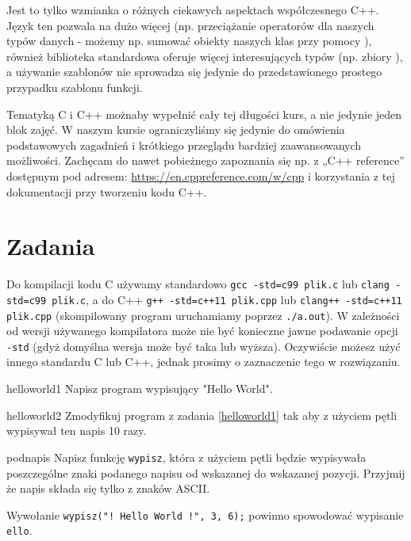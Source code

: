 \documentclass{pdfBooklets}
\begin{document}
Jest to tylko wzmianka o różnych ciekawych aspektach współczesnego C++. Język ten pozwala na dużo więcej (np. przeciążanie operatorów dla naszych typów danych - możemy np. sumować obiekty naszych klas przy pomocy \cpp{+}), również biblioteka standardowa oferuje więcej interesujących typów (np. zbiory ), a używanie szablonów nie sprowadza się jedynie do przedstawionego prostego przypadku szablonu funkcji.

Tematyką C i C++ możnaby wypełnić cały tej długości kurs, a nie jedynie jeden blok zajęć. W naszym kursie ograniczyliśmy się jedynie do omówienia podstawowych zagadnień i krótkiego przeglądu bardziej zaawansowanych możliwości. Zachęcam do nawet pobieżnego zapoznania się np. z „C++ reference” dostępnym pod adresem: \url{https://en.cppreference.com/w/cpp} i korzystania z tej dokumentacji przy tworzeniu kodu C++.

\section{Zadania}

Do kompilacji kodu C używamy standardowo \Verb#gcc -std=c99 plik.c# lub \Verb#clang -std=c99 plik.c#, a do C++ \Verb#g++ -std=c++11 plik.cpp# lub \Verb#clang++ -std=c++11 plik.cpp# (skompilowany program uruchamiamy poprzez \Verb#./a.out#).
W zależności od wersji używanego kompilatora może nie być konieczne jawne podawanie opcji \Verb#-std# (gdyż domyślna wersja może być taka lub wyższa).
Oczywiście możesz użyć innego standardu C lub C++, jednak prosimy o zaznaczenie tego w rozwiązaniu.
\vspace{3pt}

\begin{Zadanie}{}{helloworld1}
Napisz program wypisujący "Hello World".
\end{Zadanie}

\begin{Zadanie}{}{helloworld2}
Zmodyfikuj program z zadania \ref{helloworld1} tak aby z użyciem pętli wypisywał ten napis 10 razy.
\end{Zadanie}

\begin{Zadanie}{}{podnapis}
Napisz funkcję \Verb#wypisz#, która z użyciem pętli będzie wypisywała poszczególne znaki podanego napisu od wskazanej do wskazanej pozycji. Przyjmij że napis składa się tylko z znaków ASCII.

Wywołanie \Verb#wypisz("! Hello World !", 3, 6);# powinno spowodować wypisanie \Verb#ello#.
\end{Zadanie}
\end{document}
